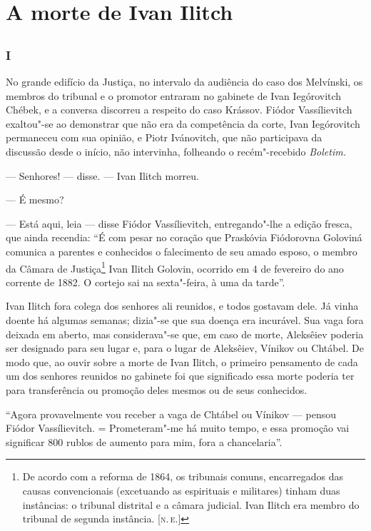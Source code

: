 \part{A morte de Ivan Ilitch}

\chapter*{}
\section*{I}

No grande edifício da Justiça, no intervalo da audiência do caso dos
Melvínski, os membros do tribunal e o promotor entraram no gabinete de
Ivan Iegórovitch Chébek, e a conversa discorreu a respeito do caso
Krássov. Fiódor Vassílievitch exaltou"-se ao demonstrar que não era da
competência da corte, Ivan Iegórovitch permaneceu com sua opinião, e
Piotr Ivánovitch, que não participava da discussão desde o início, não
intervinha, folheando o recém"-recebido \emph{Boletim.}

--- Senhores! --- disse. --- Ivan Ilitch morreu.

--- É mesmo?

--- Está aqui, leia --- disse Fiódor Vassílievitch, entregando"-lhe a edição
fresca, que ainda recendia: ``É com pesar no coração que Praskóvia
Fiódorovna Goloviná comunica a parentes e conhecidos o falecimento de
seu amado esposo, o membro da Câmara de Justiça\footnote{De acordo com a
  reforma de 1864, os tribunais comuns, encarregados das causas
  convencionais (excetuando as espirituais e militares) tinham duas
  instâncias: o tribunal distrital e a câmara judicial. Ivan Ilitch era
  membro do tribunal de segunda instância. {[}\textsc{n.\,e.}{]}} Ivan Ilitch
Golovin, ocorrido em 4 de fevereiro do ano corrente de 1882. O cortejo
sai na sexta"-feira, à uma da tarde''.

Ivan Ilitch fora colega dos senhores ali reunidos, e todos gostavam
dele. Já vinha doente há algumas semanas; dizia"-se que sua doença era
incurável. Sua vaga fora deixada em aberto, mas considerava"-se que, em
caso de morte, Aleksêiev poderia ser designado para seu lugar e, para o
lugar de Aleksêiev, Vínikov ou Chtábel. De modo que, ao ouvir sobre a
morte de Ivan Ilitch, o primeiro pensamento de cada um dos senhores
reunidos no gabinete foi que significado essa morte poderia ter para
transferência ou promoção deles mesmos ou de seus conhecidos.

``Agora provavelmente vou receber a vaga de Chtábel ou Vínikov --- pensou
Fiódor Vassílievitch. = Prometeram"-me há muito tempo, e essa promoção
vai significar 800 rublos de aumento para mim, fora a chancelaria''.

